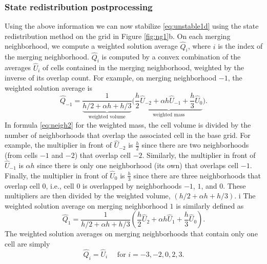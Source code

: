 \subsubsection*{State redistribution postprocessing}
Using the above information we can now stabilize \eqref{eq:unstable1d} using the state redistribution 
method on the grid in Figure \ref{fig:ng1}b.  
On each merging neighborhood, we compute a weighted solution average $\widehat Q_i$, where $i$ is the 
index of the merging neighborhood. 
$\widehat Q_i$ is computed by a convex combination of the averages $\widehat{U}_i$ of cells contained in the 
merging neighborhood, weighted by the inverse of its overlap count. 
For example, on merging neighborhood $-1$, the weighted solution average is
\begin{equation}\label{eq:neigh2}
\widehat{Q}_{-1} = \frac{1}{\underbrace{h/2 + \alpha h + h/3}_{\text{weighted volume}}}\biggr( \underbrace{\frac{h}{2} \widehat{U}_{-2} + \alpha h \widehat{U}_{-1} + \frac{h}{3}\widehat{U}_{0}}_{\text{weighted mass}} \biggr).
\end{equation}
In formula \eqref{eq:neigh2}  for the weighted mass,
the cell volume is divided by the number of neighborhoods that overlap the associated cell 
in the base grid. 
For example, the multiplier in front of $\widehat{U}_{-2}$ is $\frac{h}{2}$ since there are 
two neighborhoods (from cells $-1$ and $-2$) that overlap cell $-2$.  
Similarly, the multiplier in front of $\widehat{U}_{-1}$ is $\alpha h$ since there is only 
one neighborhood (its own) that overlaps cell $-1$.
Finally, the multiplier in front of $\widehat{U}_{0}$ is $\frac{h}{3}$ since there are three neighborhoods that overlap cell $0$, i.e., cell $0$ is overlapped by neighborhoods $-1$, $1$, and $0$.
These multipliers are then divided by the weighted volume,  $(h/2 + \alpha h + h/3)$.
i%
The weighted solution average on merging neighborhood $1$ is similarly defined as
\begin{equation}\label{eq:neigh3}
\widehat{Q}_{1} = \frac{1}{h/2 + \alpha h + h/3}\left( \frac{h}{2} \widehat{U}_{2} + \alpha h \widehat{U}_{1} + \frac{h}{3}\widehat{U}_{0} \right).
\end{equation}
The weighted solution averages on merging neighborhoods that contain only one cell are simply 
\begin{equation}\label{eq:neigh1}
\widehat{Q}_i = \widehat{U}_i \quad \text{ for } i = -3,-2,0,2,3.
\end{equation}

